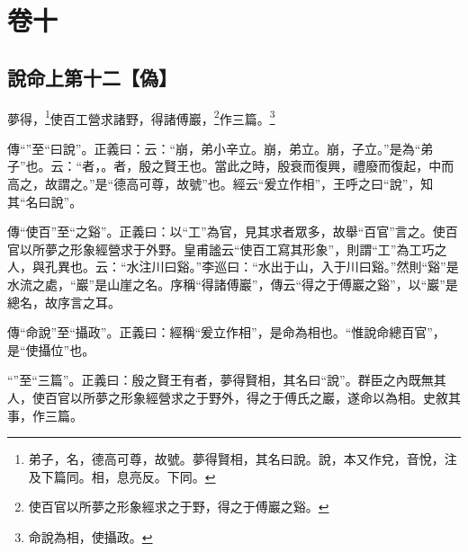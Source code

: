 

\chapter{卷十}


\section{說命上第十二【偽】}


夢得，\footnote{弟子，名，德高可尊，故號。夢得賢相，其名曰說。說，本又作兌，音悅，注及下篇同。相，息亮反。下同。}使百工營求諸野，得諸傅巖，\footnote{使百官以所夢之形象經求之于野，得之于傅巖之谿。}作三篇。\footnote{命說為相，使攝政。}


{\noindent\zhuan{}\fzbyks 傳“”至“曰說”。正義曰：云：“崩，弟小辛立。崩，弟立。崩，子立。”是為“弟子”也。云：“者，。者，殷之賢王也。當此之時，殷衰而復興，禮廢而復起，中而高之，故謂之。”是“德高可尊，故號”也。經云“爰立作相”，王呼之曰“說”，知其“名曰說”。 \par}

{\noindent\zhuan{}\fzbyks 傳“使百”至“之谿”。正義曰：以“工”為官，見其求者眾多，故舉“百官”言之。使百官以所夢之形象經營求于外野。皇甫謐云“使百工寫其形象”，則謂“工”為工巧之人，與孔異也。云：“水注川曰谿。”李巡曰：“水出于山，入于川曰谿。”然則“谿”是水流之處，“巖”是山崖之名。序稱“得諸傅巖”，傳云“得之于傅巖之谿”，以“巖”是總名，故序言之耳。 \par}

{\noindent\zhuan{}\fzbyks 傳“命說”至“攝政”。正義曰：經稱“爰立作相”，是命為相也。“惟說命總百官”，是“使攝位”也。 \par}

{\noindent\shu{}\fzkt “”至“三篇”。正義曰：殷之賢王有者，夢得賢相，其名曰“說”。群臣之內既無其人，使百官以所夢之形象經營求之于野外，得之于傅氏之巖，遂命以為相。史敘其事，作三篇。 \par}

